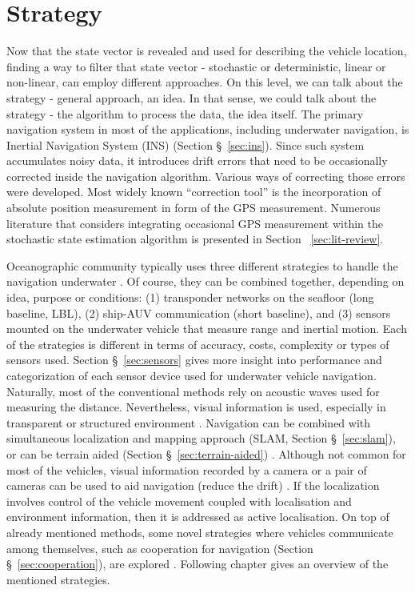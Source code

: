 \section{Strategy} 
Now that the state vector is revealed and used for describing the vehicle location, finding a way to filter that state vector - stochastic or deterministic, linear or non-linear, can employ different approaches. On this level, we can talk about the strategy - general approach, an idea. In that sense, we could talk about the strategy - the algorithm to process the data, the idea itself. The primary navigation system in most of the applications, including underwater navigation, is Inertial Navigation System (INS) (Section \S~\ref{sec:ins}). Since such system accumulates noisy data, it introduces drift errors that need to be occasionally corrected inside the navigation algorithm. Various ways of correcting those errors were developed. Most widely known ``correction tool'' is the incorporation of absolute position measurement in form of the GPS measurement. Numerous literature that considers integrating occasional GPS measurement within the stochastic state estimation algorithm is presented in Section ~\ref{sec:lit-review}. 

Oceanographic community typically uses three different strategies to handle the navigation underwater \cite{whitcomb99}. Of course, they can be combined together, depending on idea, purpose or conditions: (1) transponder networks on the seafloor (long baseline, LBL), (2) ship-AUV communication (short baseline), and (3) sensors mounted on the underwater vehicle that measure range and inertial motion. Each of the strategies is different in terms of accuracy, costs, complexity \cite{eustice05} or types of sensors used. Section \S~\ref{sec:sensors} gives more insight into performance and categorization of each sensor device used for underwater vehicle navigation. Naturally, most of the conventional methods rely on acoustic waves used for measuring the distance. Nevertheless, visual information is used, especially in transparent or structured environment \cite{carreras03}. Navigation can be combined with simultaneous localization and mapping approach (SLAM, Section \S~\ref{sec:slam}), or can be terrain aided (Section \S~\ref{sec:terrain-aided}) \cite{kinsey06}. Although not common for most of the vehicles, visual information recorded by a camera or a pair of cameras can be used to aid navigation (reduce the drift) \cite{eustice05large, bahr08}. If the localization involves control of the vehicle movement coupled with localisation and environment information, then it is addressed as active localisation. On top of already mentioned methods, some novel strategies where vehicles communicate among themselves, such as cooperation for navigation (Section \S~\ref{sec:cooperation}), are explored \cite{bahr08}. Following chapter gives an overview of the mentioned strategies.       

